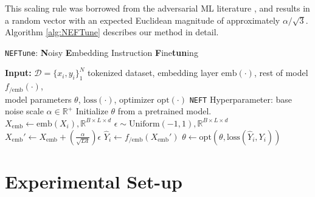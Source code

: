 \documentclass{article} %
\newcommand{\neft}{\texttt{NEFT}}
\newcommand{\neftune}{\texttt{NEFTune}}
\begin{document}
This scaling rule was borrowed from the adversarial ML literature \citep{zhu2019freelb,kong2022robust}, and results in a random vector with an expected Euclidean magnitude of approximately $\alpha/\sqrt{3}.$ Algorithm \ref{alg:NEFTune} describes our method in detail. 



\begin{algorithm}[ht]
   \caption{\neftune{}: \textbf{N}oisy \textbf{E}mbedding Instruction \textbf{F}ine\textbf{tun}ing} \label{alg:NEFTune}
\begin{minipage}{\textwidth}
\begin{algorithmic}
\State \textbf{Input:} $\mathcal{D}=\{x_i,y_i\}_1^N$ tokenized dataset, embedding layer $\text{emb}(\cdot)$, rest of model $f_{/\text{emb}}(\cdot)$, \\ model parameters $\theta$, $\text{loss}(\cdot)$, optimizer $\text{opt}(\cdot)$
\State \neft{} Hyperparameter: base noise scale $\alpha \in \mathbb{R^+}$
\vspace{0.1cm}
\State Initialize $\theta$ from a pretrained model.
\vspace{0.1cm}
\State $X_{\text{emb}} \gets \text{emb}(X_i), \mathbb{R}^{B\times L \times d}$
\State $\epsilon \sim \text{Uniform}(-1,1), \mathbb{R}^{B\times L \times d}$ 
\State $X_{\text{emb}}' \gets X_{\text{emb}} + (\frac{\alpha}{\sqrt{Ld}}) \epsilon $ 
\State $\hat{Y}_i \gets f_{/\text{emb}}(X_{\text{emb}}')$ 
\State $\theta \gets \text{opt}(\theta, \text{loss}(\hat{Y}_i,Y_i)) $ 
\end{algorithmic}
\end{minipage}
\end{algorithm}


\section{Experimental Set-up} \label{sec:Exp_set_up}
\end{document}
